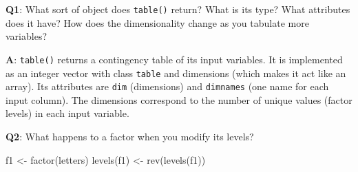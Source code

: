 \documentclass[
]{krantz}
\makeatletter
\newenvironment{Shaded}{\begin{snugshade}}{\end{snugshade}}
\newcommand{\CommentTok}[1]{\textcolor[rgb]{0.56,0.35,0.01}{\textit{#1}}}
\newcommand{\DecValTok}[1]{\textcolor[rgb]{0.00,0.00,0.81}{#1}}
\newcommand{\KeywordTok}[1]{\textcolor[rgb]{0.13,0.29,0.53}{\textbf{#1}}}
\newcommand{\NormalTok}[1]{#1}
\newcommand{\StringTok}[1]{\textcolor[rgb]{0.31,0.60,0.02}{#1}}
\newenvironment{kframe}{%
\medskip{}
\setlength{\fboxsep}{.8em}
 \def\at@end@of@kframe{}%
 \ifinner\ifhmode%
  \def\at@end@of@kframe{\end{minipage}}%
  \begin{minipage}{\columnwidth}%
 \fi\fi%
 \def\FrameCommand##1{\hskip\@totalleftmargin \hskip-\fboxsep
 \colorbox{shadecolor}{##1}\hskip-\fboxsep
     \hskip-\linewidth \hskip-\@totalleftmargin \hskip\columnwidth}%
 \MakeFramed {\advance\hsize-\width
   \@totalleftmargin\z@ \linewidth\hsize
   \@setminipage}}%
 {\par\unskip\endMakeFramed%
 \at@end@of@kframe}
\renewenvironment{Shaded}{\begin{kframe}}{\end{kframe}}
\renewcommand{\KeywordTok} [1]{\textcolor[rgb]{0.00,0.44,0.13}{{#1}}}
\renewcommand{\DecValTok}  [1]{\textcolor[rgb]{0.25,0.63,0.44}{{#1}}}
\renewcommand{\StringTok}  [1]{\textcolor[rgb]{0.25,0.44,0.63}{{#1}}}
\renewcommand{\CommentTok} [1]{\textcolor[rgb]{0.38,0.63,0.69}{{#1}}}
\renewcommand{\NormalTok}  [1]{{#1}}
\makeatother
\begin{document}
\textbf{{Q1}}: What sort of object does \texttt{table()} return? What is its type? What attributes does it have? How does the dimensionality change as you tabulate more variables?

\textbf{{A}}: \texttt{table()} returns a contingency table of its input variables. It is implemented as an integer vector with class \texttt{table} and dimensions (which makes it act like an array). Its attributes are \texttt{dim} (dimensions) and \texttt{dimnames} (one name for each input column). The dimensions correspond to the number of unique values (factor levels) in each input variable.

\begin{Shaded}
\end{Shaded}

\textbf{{Q2}}: What happens to a factor when you modify its levels?

\begin{Shaded}
\begin{Highlighting}[]
\NormalTok{f1 <-}\StringTok{ }\KeywordTok{factor}\NormalTok{(letters)}
\KeywordTok{levels}\NormalTok{(f1) <-}\StringTok{ }\KeywordTok{rev}\NormalTok{(}\KeywordTok{levels}\NormalTok{(f1))}
\end{Highlighting}
\end{Shaded}
\end{document}
